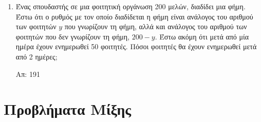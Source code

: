 \begin{enumerate}
  \item Ένας σπουδαστής σε μια φοιτητική οργάνωση 200 μελών, διαδίδει μια φήμη. Έστω 
    ότι ο ρυθμός με τον οποίο διαδίδεται η φήμη είναι ανάλογος του αριθμού των φοιτητών 
    $y$ που γνωρίζουν τη φήμη, αλλά και ανάλογος του αριθμού των φοιτητών που δεν 
    γνωρίζουν τη φήμη, $ 200-y $. Έστω ακόμη ότι μετά από μία ημέρα έχουν ενημερωθεί 
    50 φοιτητές. Πόσοι φοιτητές θα έχουν ενημερωθεί μετά από 2 ημέρες;

    \hfill Απ: 191  
\end{enumerate}


\section*{Προβλήματα Μίξης}


